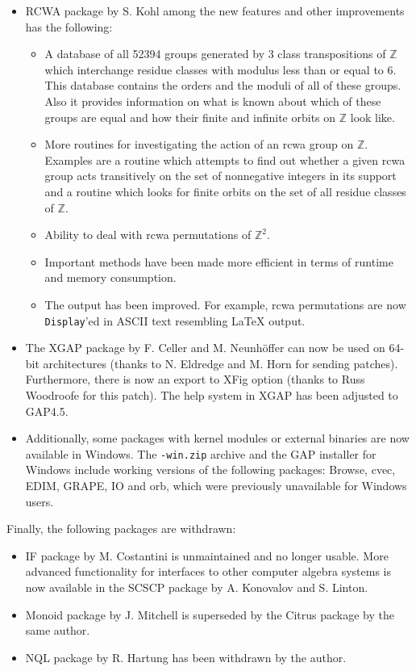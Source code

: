 \documentclass[a4paper,11pt]{report}
\begin{document}
{{{\begin{itemize}
\item  \textsf{RCWA} package by S. Kohl among the new features and other improvements has the
following: 
\begin{itemize}
\item  A database of all 52394 groups generated by 3 class transpositions of ${\ensuremath{\mathbb Z}}$ which interchange residue classes with modulus less than or equal to 6. This
database contains the orders and the moduli of all of these groups. Also it
provides information on what is known about which of these groups are equal
and how their finite and infinite orbits on ${\ensuremath{\mathbb Z}}$ look like. 
\item  More routines for investigating the action of an rcwa group on ${\ensuremath{\mathbb Z}}$. Examples are a routine which attempts to find out whether a given rcwa group
acts transitively on the set of nonnegative integers in its support and a
routine which looks for finite orbits on the set of all residue classes of ${\ensuremath{\mathbb Z}}$. 
\item  Ability to deal with rcwa permutations of ${\ensuremath{\mathbb Z}}^2$. 
\item  Important methods have been made more efficient in terms of runtime and memory
consumption. 
\item  The output has been improved. For example, rcwa permutations are now \texttt{Display}'ed in ASCII text resembling {\LaTeX} output. 
\end{itemize}
 
\item  The \textsf{XGAP} package by F. Celler and M. Neunh{\"o}ffer can now be used on 64-bit
architectures (thanks to N. Eldredge and M. Horn for sending patches).
Furthermore, there is now an export to XFig option (thanks to Russ Woodroofe
for this patch). The help system in \textsf{XGAP} has been adjusted to \textsf{GAP}{\nobreakspace}4.5. 
\item  {} Additionally, some packages with kernel modules or external binaries are now
available in Windows. The \texttt{-win.zip} archive and the \textsf{GAP} installer for Windows include working versions of the following packages: \textsf{Browse}, \textsf{cvec}, \textsf{EDIM}, \textsf{GRAPE}, \textsf{IO} and \textsf{orb}, which were previously unavailable for Windows users. 
\end{itemize}
 Finally, the following packages are withdrawn: 
\begin{itemize}
\item  \textsf{IF} package by M. Costantini is unmaintained and no longer usable. More advanced
functionality for interfaces to other computer algebra systems is now
available in the \textsf{SCSCP} package by A. Konovalov and S. Linton. 
\item  \textsf{Monoid} package by J. Mitchell is superseded by the \textsf{Citrus} package by the same author. 
\item  \textsf{NQL} package by R. Hartung has been withdrawn by the author. 
\end{itemize}
 }

}}
\end{document}
